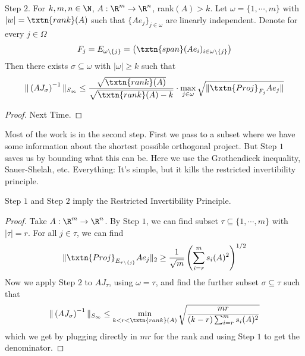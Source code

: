 \begin{lem} Step $2$. 
For $k, m, n \in \N$, $A: \R^m \to \R^n$, rank$(A) > k$. Let $\omega = \{1, \cdots, m\}$ with $|w| = \txtn{rank}(A)$ such that $\{Ae_j\}_{j \in \omega}$ are linearly independent. Denote for every $j \in \Omega$ 
\[
F_j = E_{\omega \setminus \{j\}} = \left(\txtn{span}(Ae_i)_{i \in \omega \setminus \{j\}}\right)
\]
Then there exists $\sigma \subseteq \omega$ with $|\omega| \geq k$ such that 
\[
\|\left(AJ_{\sigma}\right)^{-1}\|_{S_{\infty}} \leq \frac{\sqrt{\txtn{rank}(A)}}{\sqrt{\txtn{rank}(A) - k}} \cdot \max_{j \in \omega} \sqrt{\|\txtn{Proj}_{F_j} Ae_j\|}
\]
\end{lem}
\begin{proof}
Next Time. 
\end{proof}

Most of the work is in the second step. First we pass to a subset where we have some information about the shortest possible orthogonal project. But Step $1$ saves us by bounding what this can be. Here we use the Grothendieck inequality, Sauer-Shelah, etc. Everything: It's simple, but it kills the restricted invertibility principle. 

\begin{thm} Step $1$ and Step $2$ imply the Restricted Invertibility Principle.
\end{thm}
\begin{proof}
Take $A: \R^m \to \R^n$. 
By Step $1$, we can find subset $\tau \subseteq \{1, \cdots, m\}$ with $|\tau| = r$. For all $j \in \tau$, we can find 
\[
\|\txtn{Proj}_{E_{\tau \setminus \{j\}}} Ae_j \|_2 \geq \frac{1}{\sqrt{m}}\left(\sum_{i = r}^m s_i(A)^2\right)^{1/2}
\]
Now we apply Step $2$ to $AJ_{\tau}$, using $\omega = \tau$, and find the further subset $\sigma \subseteq \tau$ such that 
\[
\|\left(AJ_{\sigma}\right)^{-1}\|_{S_{\infty}} \leq \min_{k < r < \txtn{rank}(A)} \sqrt{\frac{mr}{(k - r)\sum_{i = r}^m s_i(A)^2}}
\]
which we get by plugging directly in $mr$ for the rank and using Step $1$ to get the denominator. 
\end{proof}
